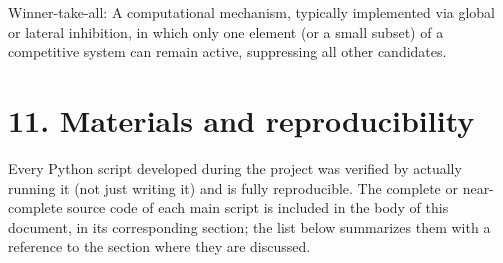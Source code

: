 \documentclass[
  english,
]{article}
\begin{document}
Winner-take-all: A computational mechanism, typically implemented via global or lateral inhibition, in which only one element (or a small subset) of a competitive system can remain active, suppressing all other candidates.

\section{11. Materials and reproducibility}\label{materials-and-reproducibility}

Every Python script developed during the project was verified by actually running it (not just writing it) and is fully reproducible. The complete or near-complete source code of each main script is included in the body of this document, in its corresponding section; the list below summarizes them with a reference to the section where they are discussed.
\end{document}
